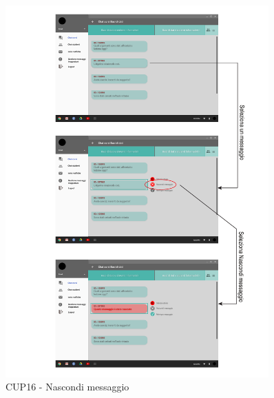 \begin{figure}
	\centering
	\includegraphics[width=0.9\textwidth]{imgs/gruppo6/activities/act_cup16_nascondi_messaggio.pdf}
	\caption{CUP16 - Nascondi messaggio}
	\label{fig:act-cup16}
\end{figure}

